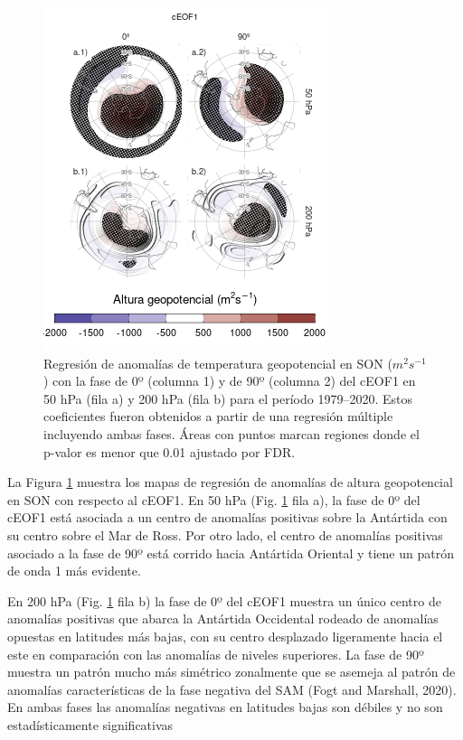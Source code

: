 \documentclass[12pt,oneside]{reedthesis}
\begin{document}
\begin{figure}
\includegraphics{figures/20-ceofs/eof1-regr-gh-1} \caption{Regresión de anomalías de temperatura geopotencial en SON (\(m^2s^{-1}\)) con la fase de 0º (columna 1) y de 90º (columna 2) del cEOF1 en 50 hPa (fila a) y 200 hPa (fila b) para el período 1979--2020. Estos coeficientes fueron obtenidos a partir de una regresión múltiple incluyendo ambas fases. Áreas con puntos marcan regiones donde el p-valor es menor que 0.01 ajustado por FDR.}\label{fig:eof1-regr-gh}
\end{figure}

La Figura \ref{fig:eof1-regr-gh} muestra los mapas de regresión de anomalías de altura geopotencial en SON con respecto al cEOF1.
En 50 hPa (Fig. \ref{fig:eof1-regr-gh} fila a), la fase de 0º del cEOF1 está asociada a un centro de anomalías positivas sobre la Antártida con su centro sobre el Mar de Ross.
Por otro lado, el centro de anomalías positivas asociado a la fase de 90º está corrido hacia Antártida Oriental y tiene un patrón de onda 1 más evidente.

En 200 hPa (Fig. \ref{fig:eof1-regr-gh} fila b) la fase de 0º del cEOF1 muestra un único centro de anomalías positivas que abarca la Antártida Occidental rodeado de anomalías opuestas en latitudes más bajas, con su centro desplazado ligeramente hacia el este en comparación con las anomalías de niveles superiores.
La fase de 90º muestra un patrón mucho más simétrico zonalmente que se asemeja al patrón de anomalías características de la fase negativa del SAM (Fogt and Marshall, 2020).
En ambas fases las anomalías negativas en latitudes bajas son débiles y no son estadísticamente significativas
\end{document}
